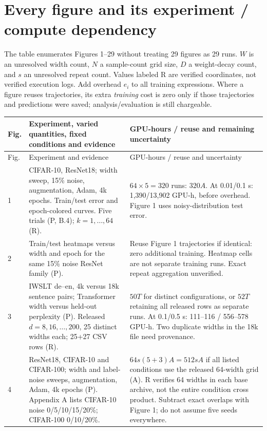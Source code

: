 \documentclass{article}
\begin{document}
\section{Every figure and its experiment / compute dependency}
The table enumerates Figures 1--29 without treating 29 figures as 29 runs.
$W$ is an unresolved width count, $N$ a sample-count grid size, $D$ a
weight-decay count, and $s$ an unresolved repeat count. Values labeled R are
verified coordinates, not verified execution logs. Add overhead $e_i$ to
all training expressions. Where a figure reuses trajectories, its extra
\emph{training} cost is zero only if those trajectories and predictions were
saved; analysis/evaluation is still chargeable.
\begingroup\small
\setlength{\tabcolsep}{4pt}\renewcommand{\arraystretch}{1.13}
\begin{longtable}{@{}P{0.32in}P{3.47in}P{2.9in}@{}}
\toprule
Fig. & Experiment, varied quantities, fixed conditions and evidence & GPU-hours / reuse and remaining uncertainty\\
\midrule\endfirsthead
\toprule Fig. & Experiment and evidence & GPU-hours / reuse and uncertainty\\\midrule{} & CIFAR-10, ResNet18; width sweep, 15\% noise, augmentation, Adam, 4k epochs. Train/test error and epoch-colored curves. Five trials (P, B.4); $k=1,\ldots,64$ (R). & $64\times5=320$ runs: $320A$. At 0.01/0.1 s: 1,390/13,902 GPU-h, before overhead. Figure 1 uses noisy-distribution test error.\\
2 & Train/test heatmaps versus width and epoch for the same 15\% noise ResNet family (P). & Reuse Figure 1 trajectories if identical: zero additional training. Heatmap cells are not separate training runs. Exact repeat aggregation unverified.\\
3 & IWSLT de--en, 4k versus 18k sentence pairs; Transformer width versus held-out perplexity (P). Released $d=8,16,\ldots,200$, 25 distinct widths each; 25+27 CSV rows (R). & $50T$ for distinct configurations, or $52T$ retaining all released rows as separate runs. At 0.1/0.5 s: 111--116 / 556--578 GPU-h. Two duplicate widths in the 18k file need provenance.\\
4 & ResNet18, CIFAR-10 and CIFAR-100; width and label-noise sweeps, augmentation, Adam, 4k epochs (P). Appendix A lists CIFAR-10 noise 0/5/10/15/20\%; CIFAR-100 0/10/20\%. & $64s(5+3)A=512sA$ if all listed conditions use the released 64-width grid (A). R verifies 64 widths in each base archive, not the entire condition cross product. Subtract exact overlaps with Figure 1; do not assume five seeds everywhere.\\

\end{longtable}
\end{document}

